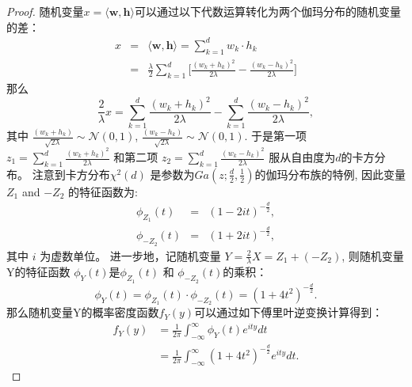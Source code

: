 \begin{proof}
随机变量$x=\langle \mathbf{w}, \mathbf{h} \rangle$可以通过以下代数运算转化为两个伽玛分布的随机变量的差：
\begin{eqnarray}
	x &=& \langle {\mathbf{w}},{\mathbf{h}} \rangle = \sum\nolimits_{k = 1}^d {w_k} \cdot {h_{k}} \nonumber\\
	&=& \frac{{{\lambda }}}{2}\sum\nolimits_{k = 1}^d {[\frac{{{{({w_{k}} + {h_{k}})}^2}}}{{2{\lambda  }}} - } \frac{{{{({w_{k}} - {h_{k}})}^2}}}{{2{\lambda  }}}]
\end{eqnarray}
那么
\begin{equation}
	\frac{2}{{{\lambda  }}}x = \sum_{k = 1}^{d} \frac{{{{({w_{k}} + {h_{k}})}^2}}}{{2{\lambda }}} - \sum_{k = 1}^{d} \frac{{{{({w_{k}} - {h_{k}})}^2}}}{{2{\lambda  }}},
\end{equation}
其中 $\frac{(w_k + h_k)}{\sqrt {2{\lambda}}} \sim \mathcal{N}(0,1)$, $\frac{(w_k - h_k)}{\sqrt {2{\lambda}}} \sim \mathcal{N}(0,1)$. 于是第一项${z_1} = \sum\nolimits_{k = 1}^d {\frac{{{{({w_{k}} + {h_{k}})}^2}}}{{2{\lambda }}}} $ 和第二项 ${z_2} = \sum\nolimits_{k = 1}^d {\frac{{{{({w_{k}} - {h_{k}})}^2}}}{{2{\lambda }}}} $ 服从自由度为$d$的卡方分布。 注意到卡方分布${\chi ^2}(d)$ 是参数为$Ga(z;\frac{d}{2},\frac{1}{2})$的伽玛分布族的特例, 因此变量${Z_1}$ and $ - {Z_2}$ 的特征函数为:
\begin{eqnarray}
	{\phi _{{Z_1}}}(t) &=& {(1 - 2it)^{ - \frac{d}{2}}}, \\
	{\phi _{ - {Z_2}}}(t) &=& {(1 + 2it)^{ - \frac{d}{2}}},
\end{eqnarray}
其中 $i$ 为虚数单位。 进一步地，记随机变量 $Y = \frac{2}{{{\lambda }}}X  = {Z_1} + ( - {Z_2})$, 则随机变量Y的特征函数 ${\phi _Y}(t)$是${\phi _{{Z_1}}}(t)$ 和 ${\phi _{ - {Z_2}}}(t)$的乘积：
\begin{equation}
	{\phi _Y}(t) = {\phi _{{Z_1}}}(t) \cdot {\phi _{ - {Z_2}}}(t) = {(1 + 4{t^2})^{ - \frac{d}{2}}}.
\end{equation}
那么随机变量Y的概率密度函数${f_Y}(y)$可以通过如下傅里叶逆变换计算得到：
\begin{equation}
	\begin{split}
		{f_Y}(y) &= \frac{1}{{2\pi }}\int_{ - \infty }^\infty  {{\phi _Y}(t){e^{ity}}dt} \\
		& = \frac{1}{{2\pi }}\int_{ - \infty }^\infty  {{{(1 + 4{t^2})}^{ - \frac{d}{2}}}{e^{ity}}dt}.
	\end{split}
\end{equation}


\end{proof}
